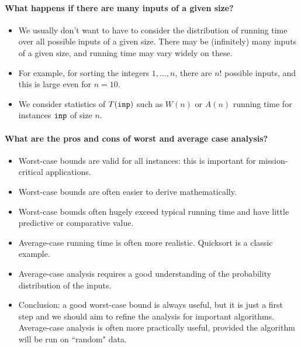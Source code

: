 \paragraph{What happens if there are many inputs of a given size?}
\begin{itemize}
\item We usually don't want to have to consider the distribution of
running time over all possible inputs of a given size. There may be (infinitely)
many inputs of a given size, and running time may vary widely on these. 
\item For example, for sorting the integers $1, \dots, n$, there are $n!$ possible inputs, and this is large even for $n=10$.
\item We consider statistics of $T(\operatorname{\text{\texttt{inp}}})$ such as  $W(n)$ or 
 $A(n)$ running time for instances $\operatorname{\text{\texttt{inp}}}$ of size $n$.
\end{itemize}


\paragraph{What are the pros and cons of worst and average case analysis?}
\begin{itemize}
\item Worst-case bounds are valid for all instances: 
this is important for mission-critical applications.
\item Worst-case bounds are often easier to derive mathematically.
\item Worst-case bounds often hugely exceed typical running time and 
have little predictive or comparative value. 
\item Average-case running time is often more realistic. Quicksort is a classic 
example.
\item Average-case analysis requires a good understanding of the probability 
distribution of the inputs.
\item Conclusion: a good worst-case bound is always useful, but it is
just a first step and we should aim to refine the analysis for important 
algorithms. Average-case analysis is often more practically useful, provided the
 algorithm will be run on ``random" data. 
\end{itemize}




